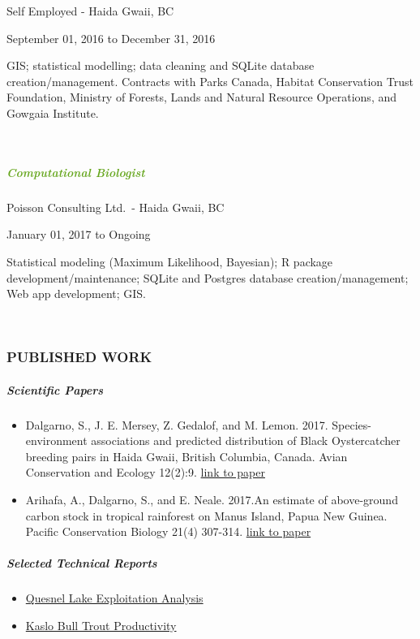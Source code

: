 \documentclass[
]{article}
\providecommand{\tightlist}{%
  \setlength{\itemsep}{0pt}\setlength{\parskip}{0pt}}
\begin{document}
Self Employed - Haida Gwaii, BC

September 01, 2016 to December 31, 2016

GIS; statistical modelling; data cleaning and SQLite database
creation/management. Contracts with Parks Canada, Habitat Conservation
Trust Foundation, Ministry of Forests, Lands and Natural Resource
Operations, and Gowgaia Institute.

~

\hypertarget{section-6}{%
\subparagraph{\texorpdfstring{\textcolor{#66A61E}{Computational Biologist}}{}}\label{section-6}}

Poisson Consulting Ltd.~- Haida Gwaii, BC

January 01, 2017 to Ongoing

Statistical modeling (Maximum Likelihood, Bayesian); R package
development/maintenance; SQLite and Postgres database
creation/management; Web app development; GIS.

~

\hypertarget{published-work}{%
\subsubsection{PUBLISHED WORK}\label{published-work}}

\hypertarget{scientific-papers}{%
\subparagraph{Scientific Papers}\label{scientific-papers}}

\begin{itemize}
\tightlist
\item
  Dalgarno, S., J. E. Mersey, Z. Gedalof, and M. Lemon. 2017.
  Species-environment associations and predicted distribution of Black
  Oystercatcher breeding pairs in Haida Gwaii, British Columbia, Canada.
  Avian Conservation and Ecology 12(2):9.
  \href{http://www.ace-eco.org/vol12/iss2/art9/}{link to paper}
\item
  Arihafa, A., Dalgarno, S., and E. Neale. 2017.An estimate of
  above-ground carbon stock in tropical rainforest on Manus Island,
  Papua New Guinea. Pacific Conservation Biology 21(4) 307-314.
  \href{http://www.publish.csiro.au/PC/PC15015}{link to paper}
\end{itemize}

\hypertarget{selected-technical-reports}{%
\subparagraph{Selected Technical
Reports}\label{selected-technical-reports}}

\begin{itemize}
\tightlist
\item
  \href{https://www.poissonconsulting.ca/analyses/2018/04/11/quesnel-exploit-17.html}{Quesnel
  Lake Exploitation Analysis}
\item
  \href{https://www.poissonconsulting.ca/analyses/2018/04/17/kaslo-bt-recruits-17.html}{Kaslo
  Bull Trout Productivity}
\end{itemize}
\end{document}
